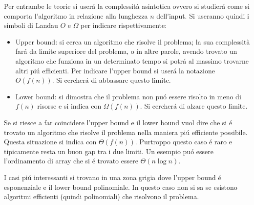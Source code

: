 Per entrambe le teorie si userá la complessità asintotica ovvero si studierá come si comporta l'algoritmo in relazione alla lunghezza $n$ dell'input. Si useranno quindi i simboli di Landau $O$ e $\Omega$ per indicare rispettivamente:
\begin{itemize}
    \item Upper bound: si cerca un algoritmo che risolve il problema; la sua complessità fará da limite superiore del problema, o in altre parole, avendo trovato un algoritmo che funziona in un determinato tempo si potrá al massimo trovarne altri piú efficienti. Per indicare l'upper bound si userá la notazione $O(f(n))$. Si cercherá di abbassare questo limite.
    \item Lower bound: si dimostra che il problema non puó essere risolto in meno di $f(n)$ risorse e si indica con $\Omega(f(n))$. Si cercherá di alzare questo limite.
\end{itemize}

Se si riesce a far coincidere l'upper bound e il lower bound vuol dire che si é trovato un algoritmo che risolve il problema nella maniera piú efficiente possibile. Questa situazione si indica con $\Theta(f(n))$. Purtroppo questo caso é raro e tipicamente resta un buon gap tra i due limiti. Un esempio puó essere l'ordinamento di array che si é trovato essere $\Theta(n\log{n})$.

I casi piú interessanti si trovano in una zona grigia dove l'upper bound é esponenziale e il lower bound polinomiale. In questo caso non si sa se esistono algoritmi efficienti (quindi polinomiali) che risolvono il problema.